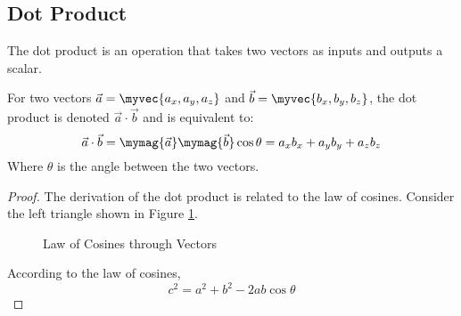 \documentclass[11pt]{article}
\newenvironment{mybox}
{\begin{tcolorbox}[colback=red!5!white,colframe=red!75!black]}
{\end{tcolorbox}}
\newtheorem{proof}{Proof}
\begin{document}
\subsection{Dot Product}
The dot product is an operation that takes two vectors as inputs and outputs a scalar.
\begin{mybox}

    For two vectors $\vec{a}=\myvec{a_x,a_y,a_z}$ and $\vec{b}=\myvec{b_x,b_y,b_z}$, the dot product is denoted $\vec{a} \cdot \vec{b}$ and is equivalent to:
    \begin{equation*}
        \vec{a} \cdot \vec{b} = \mymag{\vec{a}}\mymag{\vec{b}}\cos{\theta} = a_xb_x+a_yb_y+a_zb_z
    \end{equation*}
    Where $\theta$ is the angle between the two vectors.
\end{mybox}
\begin{proof}
    The derivation of the dot product is related to the law of cosines. Consider the left triangle shown in Figure \ref{two_triangles}.
\begin{figure}
\centering
\begin{subfigure}
    \centering
\end{subfigure}
\begin{subfigure}
    \centering
\end{subfigure}
\caption{Law of Cosines through Vectors}
\label{two_triangles}
\end{figure}
According to the law of cosines,
\begin{equation*}
    c^2=a^2+b^2-2ab\cos{\theta}

\end{equation*}
\end{proof}
\end{document}
